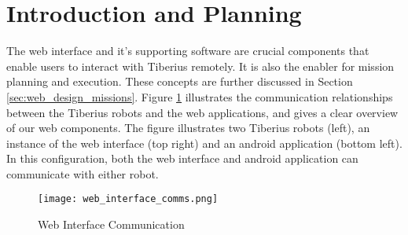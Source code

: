 \section{Introduction and Planning}

The web interface and it's supporting software are crucial components that enable users to interact with Tiberius remotely. It is also the enabler for mission planning and execution. These concepts are further discussed in Section  \ref{sec:web_design_missions}.
\newline
Figure \ref{fig:web-interface-communication} illustrates the communication relationships between the Tiberius robots and the web applications, and gives a clear overview of our web components. The figure illustrates two Tiberius robots (left), an instance of the web interface (top right) and an android application (bottom left). In this configuration, both the web interface and android application can communicate with either robot.

\begin{figure}[!htb]
\begin{center}
\texttt{[image: web\_interface\_comms.png]}
\end{center}
\caption{Web Interface Communication}
\label{fig:web-interface-communication}
\end{figure}

